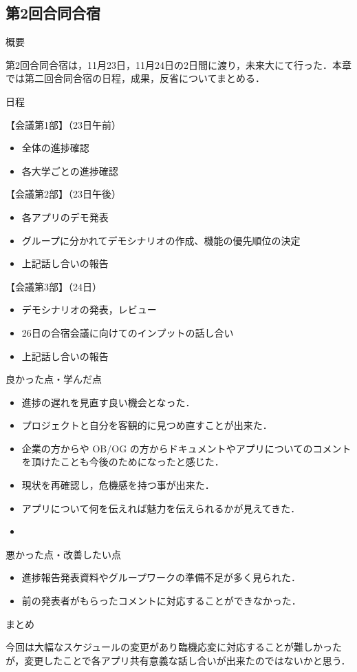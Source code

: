 \subsection{第2回合同合宿}
\par
概要
\par 
第2回合同合宿は，11月23日，11月24日の2日間に渡り，未来大にて行った．本章では第二回合同合宿の日程，成果，反省についてまとめる．
\par
日程
\par
【会議第1部】（23日午前）
\begin{itemize}
\item 全体の進捗確認
\item 各大学ごとの進捗確認
\end{itemize}
【会議第2部】（23日午後）
\begin{itemize}
\item 各アプリのデモ発表
\item グループに分かれてデモシナリオの作成、機能の優先順位の決定
\item 上記話し合いの報告
\end{itemize}
【会議第3部】（24日）
\begin{itemize}
\item デモシナリオの発表，レビュー
\item 26日の合宿会議に向けてのインプットの話し合い
\item 上記話し合いの報告
\end{itemize}

\par
良かった点・学んだ点
\begin{itemize}
\item 進捗の遅れを見直す良い機会となった．
\item プロジェクトと自分を客観的に見つめ直すことが出来た．
\item 企業の方からや OB/OG の方からドキュメントやアプリについてのコメントを頂けたことも今後のためになったと感じた．
\item 現状を再確認し，危機感を持つ事が出来た．
\item アプリについて何を伝えれば魅力を伝えられるかが見えてきた．
\item 
\end{itemize}
\par
悪かった点・改善したい点
\begin{itemize}
\item 進捗報告発表資料やグループワークの準備不足が多く見られた．
\item 前の発表者がもらったコメントに対応することができなかった．
\end{itemize}
\par
まとめ
\par 今回は大幅なスケジュールの変更があり臨機応変に対応することが難しかったが，変更したことで各アプリ共有意義な話し合いが出来たのではないかと思う．

